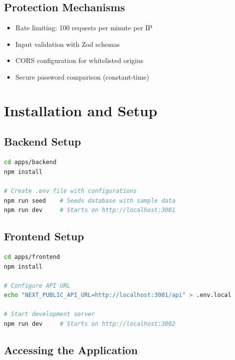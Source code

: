 \documentclass[12pt, a4paper, oneside]{report}
\begin{document}
\section{Protection Mechanisms}

\begin{itemize}
  \item Rate limiting: 100 requests per minute per IP
  \item Input validation with Zod schemas
  \item CORS configuration for whitelisted origins
  \item Secure password comparison (constant-time)
\end{itemize}

\chapter{Installation and Setup}

\section{Backend Setup}

\begin{lstlisting}[language=bash]
cd apps/backend
npm install

# Create .env file with configurations
npm run seed    # Seeds database with sample data
npm run dev     # Starts on http://localhost:3001
\end{lstlisting}

\section{Frontend Setup}

\begin{lstlisting}[language=bash]
cd apps/frontend
npm install

# Configure API URL
echo "NEXT_PUBLIC_API_URL=http://localhost:3001/api" > .env.local

# Start development server
npm run dev     # Starts on http://localhost:3002
\end{lstlisting}

\section{Accessing the Application}
\end{document}
